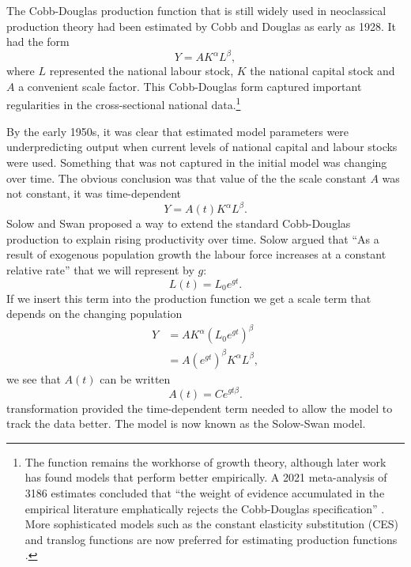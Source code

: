 The \gls{Cobb-Douglas} production function that is still widely used in neoclassical production theory had been estimated by Cobb and Douglas \cite{cobbTheoryProduction1928} as early as 1928. It had the form
\begin{equation*}
Y=AK^\alpha L^\beta, 
 \label{eqn-Cobb-Douglas}    
\end{equation*}
where $L$ represented the national labour stock, $K$ the national capital stock and  $A$ a convenient scale factor. This \gls{Cobb-Douglas} form captured important regularities in the cross-sectional national data.\footnote{The function remains the workhorse of growth theory, although later work has found models that perform better empirically.  A 2021 meta-analysis of 3186 estimates concluded that ``the weight of evidence accumulated in the empirical literature emphatically rejects the Cobb-Douglas specification'' \cite{gechertMeasuringCapitallaborSubstitution2021}. %
 More sophisticated models such as the constant elasticity substitution (CES) and translog %
functions are now preferred for estimating production functions \cite{kimTranslogProductionFunction1992}.}  %

By the early 1950s, it was clear that estimated model parameters were underpredicting output when current levels of national capital and labour stocks were used. Something that was not captured in the initial model was changing over time. The obvious conclusion was that value of the the scale constant $A$  was not constant, it was time-dependent  
 \[Y=A(t)K^\alpha L^\beta.\]
Solow and Swan proposed a way to extend the standard \gls{Cobb-Douglas} production to explain rising productivity over time. 
Solow  argued that ``As a result of exogenous population growth the labour force increases at a constant relative rate'' that we will represent by  $g$:
  \[L(t)= L_0e^{gt}.\] 
If we insert this term into the production function we get a scale term that depends on the changing population 
\begin{eqnarray}
Y &= AK^\alpha (L_0e^{gt})^\beta\nonumber\\
  &= A(e^{gt})^{\beta}K^\alpha L^\beta,
\label{eqn-solow-swan3}
\end{eqnarray}
we see that $A(t)$ can be written
 \[A(t)=Ce^{gt\beta}.\]
transformation provided the time-dependent term needed to allow the model to track the data better. The model is now known as the \gls{Solow-Swan model}. 

